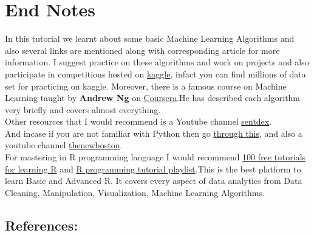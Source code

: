 \documentclass[Proceedings]{ascelike}
\begin{document}
{\section{End Notes}
In this tutorial we learnt about some basic Machine Learning Algorithms and also several links are mentioned along with corresponding article for more information. I suggest practice on these algorithms and work on projects and also participate in competitions hosted on \href{https://www.kaggle.com/}{kaggle}, infact you can find millions of data set for practicing on kaggle. Moreover, there is a famous course on Machine Learning taught by \textbf{Andrew Ng} on \href{https://www.coursera.org/learn/machine-learning}{Coursera}.He has described each algorithm very briefly and covers almost everything.\\
Other resources that I would recommend is a Youtube channel \href{https://www.youtube.com/user/sentdex}{sentdex}.\\And incase if you are not familiar with Python then go \href{https://www.analyticsvidhya.com/blog/2016/01/complete-tutorial-learn-data-science-python-scratch-2/}{through this}, and also a youtube channel \href{https://www.youtube.com/user/thenewboston}{thenewboston}.\\For mastering in R programming language I would recommend \href{http://www.listendata.com/p/r-programming-tutorials.html}{100 free tutorials for learning R} and \href{https://www.youtube.com/playlist?list=PL6gx4Cwl9DGCzVMGCPi1kwvABu7eWv08P}{R programming tutorial playlist}.This is the best platform to learn Basic and Advanced R. It covers every aspect of data analytics from Data Cleaning, Manipulation, Visualization, Machine Learning Algorithms.

\subsection{References:}
\begin{itemize}
	

\end{itemize}}
\end{document}
